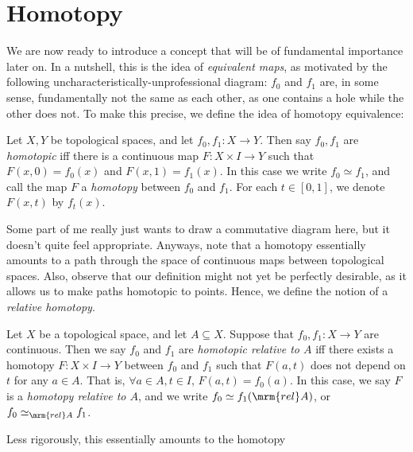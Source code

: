 \documentclass{fkbook}
\begin{document}
\section{Homotopy}
\begin{adjustwidth}{1em}{1em}
  We are now ready to introduce a concept that will be of fundamental
  importance later on. In a nutshell, this is the idea of
  \emph{equivalent maps}, as motivated by the following
  uncharacteristically-unprofessional diagram:
  $f_0$ and $f_1$ are, in some sense, fundamentally not the same as
  each other, as one contains a hole while the other does not. To make
  this precise, we define the idea of homotopy equivalence:
  \begin{definition}
    Let $X,Y$ be topological spaces, and let $f_0, f_1 : X \to Y$.
    Then say $f_0, f_1$ are \emph{homotopic} iff there is a continuous
    map $F : X \times I \to Y$ such that $F(x,0) = f_0(x)$ and $F(x,1)
    = f_1(x)$. In this case we write $f_0 \simeq f_1$, and call the
    map $F$ a \emph{homotopy} between $f_0$ and $f_1$. For each $t \in
    [0,1]$, we denote $F(x,t)$ by $f_t(x)$.
  \end{definition}
  Some part of me really just wants to draw a commutative diagram
  here, but it doesn't quite feel appropriate. Anyways, note that a
  homotopy essentially amounts to a path through the space of
  continuous maps between topological spaces. Also, observe that our
  definition might not yet be perfectly desirable, as it allows us to
  make paths homotopic to points. Hence, we define the notion of a
  \emph{relative homotopy}.
  \begin{definition}
    Let $X$ be a topological space, and let $A \subseteq X$. Suppose
    that $f_0, f_1 : X \to Y$ are continuous. Then we say $f_0$ and
    $f_1$ are \emph{homotopic relative to $A$} iff there exists a
    homotopy $F : X \times I \to Y$ between $f_0$ and $f_1$ such that
    $F(a,t)$ does not depend on $t$ for any $a \in A$. That is,
    $\forall a \in A, t \in I$, $F(a,t) = f_0(a)$. In this case, we
    say $F$ is a \emph{homotopy relative to $A$}, and we write $f_0
    \simeq f_1 (\mrm{rel} A)$, or $f_0 \simeq_{\mrm{rel} A} f_1$.
  \end{definition}
  Less rigorously, this essentially amounts to the homotopy

\end{adjustwidth}
\end{document}
